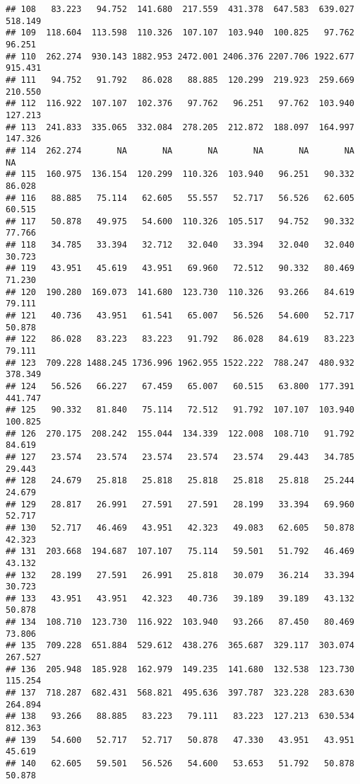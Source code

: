 \documentclass[
]{article}
\begin{document}
\begin{verbatim}
## 108   83.223   94.752  141.680  217.559  431.378  647.583  639.027  518.149
## 109  118.604  113.598  110.326  107.107  103.940  100.825   97.762   96.251
## 110  262.274  930.143 1882.953 2472.001 2406.376 2207.706 1922.677  915.431
## 111   94.752   91.792   86.028   88.885  120.299  219.923  259.669  210.550
## 112  116.922  107.107  102.376   97.762   96.251   97.762  103.940  127.213
## 113  241.833  335.065  332.084  278.205  212.872  188.097  164.997  147.326
## 114  262.274       NA       NA       NA       NA       NA       NA       NA
## 115  160.975  136.154  120.299  110.326  103.940   96.251   90.332   86.028
## 116   88.885   75.114   62.605   55.557   52.717   56.526   62.605   60.515
## 117   50.878   49.975   54.600  110.326  105.517   94.752   90.332   77.766
## 118   34.785   33.394   32.712   32.040   33.394   32.040   32.040   30.723
## 119   43.951   45.619   43.951   69.960   72.512   90.332   80.469   71.230
## 120  190.280  169.073  141.680  123.730  110.326   93.266   84.619   79.111
## 121   40.736   43.951   61.541   65.007   56.526   54.600   52.717   50.878
## 122   86.028   83.223   83.223   91.792   86.028   84.619   83.223   79.111
## 123  709.228 1488.245 1736.996 1962.955 1522.222  788.247  480.932  378.349
## 124   56.526   66.227   67.459   65.007   60.515   63.800  177.391  441.747
## 125   90.332   81.840   75.114   72.512   91.792  107.107  103.940  100.825
## 126  270.175  208.242  155.044  134.339  122.008  108.710   91.792   84.619
## 127   23.574   23.574   23.574   23.574   23.574   29.443   34.785   29.443
## 128   24.679   25.818   25.818   25.818   25.818   25.818   25.244   24.679
## 129   28.817   26.991   27.591   27.591   28.199   33.394   69.960   52.717
## 130   52.717   46.469   43.951   42.323   49.083   62.605   50.878   42.323
## 131  203.668  194.687  107.107   75.114   59.501   51.792   46.469   43.132
## 132   28.199   27.591   26.991   25.818   30.079   36.214   33.394   30.723
## 133   43.951   43.951   42.323   40.736   39.189   39.189   43.132   50.878
## 134  108.710  123.730  116.922  103.940   93.266   87.450   80.469   73.806
## 135  709.228  651.884  529.612  438.276  365.687  329.117  303.074  267.527
## 136  205.948  185.928  162.979  149.235  141.680  132.538  123.730  115.254
## 137  718.287  682.431  568.821  495.636  397.787  323.228  283.630  264.894
## 138   93.266   88.885   83.223   79.111   83.223  127.213  630.534  812.363
## 139   54.600   52.717   52.717   50.878   47.330   43.951   43.951   45.619
## 140   62.605   59.501   56.526   54.600   53.653   51.792   50.878   50.878

\end{verbatim}
\end{document}
